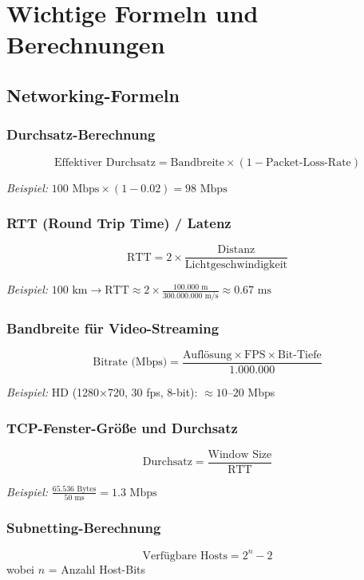 \documentclass[12pt,a4paper,german]{report}
\begin{document}
\newpage
\part{Wichtige Formeln und Berechnungen}

\chapter{Networking-Formeln}

\section{Durchsatz-Berechnung}
\[
\text{Effektiver Durchsatz} = \text{Bandbreite} \times (1 - \text{Packet-Loss-Rate})
\]

\textit{Beispiel:} $100 \text{ Mbps} \times (1 - 0.02) = 98 \text{ Mbps}$

\section{RTT (Round Trip Time) / Latenz}
\[
\text{RTT} = 2 \times \frac{\text{Distanz}}{\text{Lichtgeschwindigkeit}}
\]

\textit{Beispiel:} $100 \text{ km} \rightarrow \text{RTT} \approx 2 \times \frac{100.000 \text{ m}}{300.000.000 \text{ m/s}} \approx 0.67 \text{ ms}$

\section{Bandbreite für Video-Streaming}
\[
\text{Bitrate (Mbps)} = \frac{\text{Auflösung} \times \text{FPS} \times \text{Bit-Tiefe}}{1.000.000}
\]

\textit{Beispiel:} HD (1280×720, 30 fps, 8-bit): $\approx 10$--$20$ Mbps

\section{TCP-Fenster-Größe und Durchsatz}
\[
\text{Durchsatz} = \frac{\text{Window Size}}{\text{RTT}}
\]

\textit{Beispiel:} $\frac{65.536 \text{ Bytes}}{50 \text{ ms}} = 1.3 \text{ Mbps}$

\section{Subnetting-Berechnung}
\[
\text{Verfügbare Hosts} = 2^n - 2
\]
wobei $n$ = Anzahl Host-Bits
\end{document}
